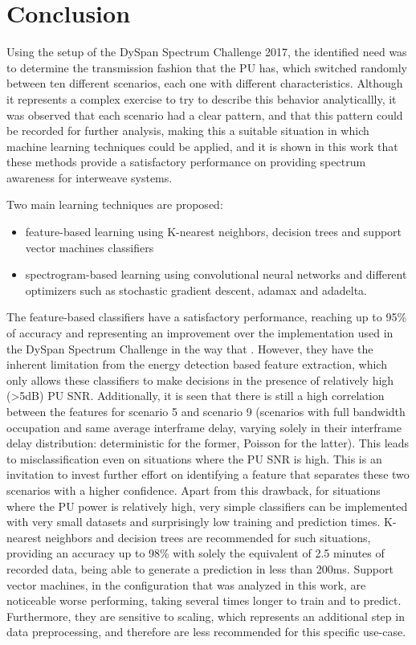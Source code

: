 \chapter{Conclusion}\label{chapter:conclusion} \label{ch:conclusions}
Using the setup of the DySpan Spectrum Challenge 2017, the identified need was to determine the transmission fashion that the \ac{PU} has, which switched randomly between ten different scenarios, each one with different characteristics. Although it represents a complex exercise to try to describe this behavior analyticallly, it was observed that each scenario had a clear pattern, and that this pattern could be recorded for further analysis, making this a suitable situation in which machine learning techniques could be applied, and it is shown in this work that these methods provide a satisfactory performance on providing spectrum awareness for interweave systems.

Two main learning techniques are proposed:

\begin{itemize}
    \item feature-based learning using K-nearest neighbors, decision trees and support vector machines classifiers
    \item spectrogram-based learning using convolutional neural networks and different optimizers such as stochastic gradient descent, adamax and adadelta.
\end{itemize}

The feature-based classifiers have a satisfactory performance, reaching up to 95\% of accuracy and representing an improvement over the implementation used in the DySpan Spectrum Challenge in the way that . However, they have the inherent limitation from the energy detection based feature extraction, which only allows these classifiers to make decisions in the presence of relatively high (>5dB) PU SNR. Additionally, it is seen that there is still a high correlation between the features for scenario 5 and scenario 9 (scenarios with full bandwidth occupation and same average interframe delay, varying solely in their interframe delay distribution: deterministic for the former, Poisson for the latter). This leads to misclassification even on situations where the \ac{PU} \ac{SNR} is high. This is an invitation to invest further effort on identifying a feature that separates these two scenarios with a higher confidence. Apart from this drawback, for situations where the \ac{PU} power is relatively high, very simple classifiers can be implemented with very small datasets and surprisingly low training and prediction times. K-nearest neighbors and decision trees are recommended for such situations, providing an accuracy up to 98\% with solely the equivalent of 2.5 minutes of recorded data, being able to generate a prediction in less than 200ms. Support vector machines, in the configuration that was analyzed in this work, are noticeable worse performing, taking several times longer to train and to predict. Furthermore, they are sensitive to scaling, which represents an additional step in data preprocessing, and therefore are less recommended for this specific use-case.


